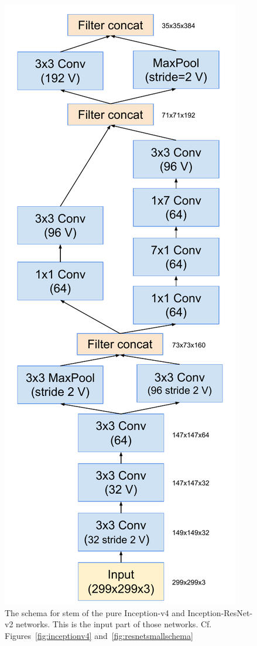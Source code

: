 \begin{figure}
\centering
\includegraphics[width=0.7\linewidth]{inceptionv4stem}
\caption{The schema for stem of the pure Inception-v4 and
  Inception-ResNet-v2 networks. This is the input part of those
networks. Cf. Figures~\ref{fig:inceptionv4} and~\ref{fig:resnetsmallschema} }
\label{fig:inceptionv4stem}
\end{figure}
